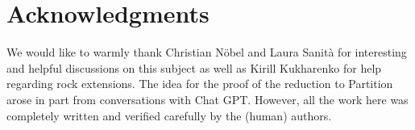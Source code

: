 \documentclass[centering,11pt,reqno]{amsart}
\theoremstyle{definition}
\begin{document}

\section*{Acknowledgments} We would like to warmly thank Christian N\"{o}bel and Laura Sanit\`a for interesting and helpful discussions on this subject as well as Kirill Kukharenko for help regarding rock extensions. The idea for the proof of the reduction to Partition arose in part from conversations with Chat GPT. However, all the work here was completely written and verified carefully by the (human) authors.



\end{document}
